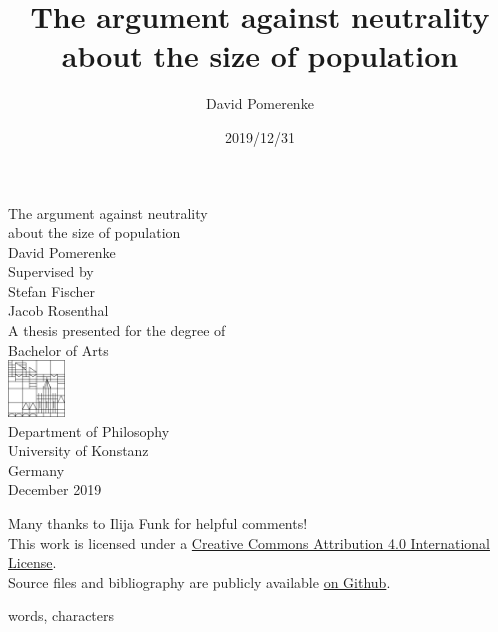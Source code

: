 \documentclass{report}
\title{The argument against neutrality about the size of population}
\author{David Pomerenke}
\date{2019/12/31}
\begin{document}
\begin{titlepage}
    \begin{center}
        \huge
        The argument against neutrality\\
        about the size of population\\
        \vspace*{1cm}
        \large
        David Pomerenke\\
        \vfill
        Supervised by\\
        Stefan Fischer\\
        Jacob Rosenthal\\
        \vfill
        A thesis presented for the degree of\\
        Bachelor of Arts\\
        \vfill
        \includegraphics[width=1.5cm]{0-logo.png}\\
        Department of Philosophy\\
        University of Konstanz\\
        Germany\\
        December 2019\\
    \end{center}
\end{titlepage}

\tableofcontents
\vfill

\begin{center}
    \footnotesize
    Many thanks to Ilija Funk for helpful comments! \\
    This work is licensed under a \href{http://creativecommons.org/licenses/by/4.0/}{Creative Commons Attribution 4.0 International License}. \\
    Source files and bibliography are publicly available \href{https://github.com/davidpomerenke/ba}{on Github}.
\end{center}













words, 
characters
\end{document}
